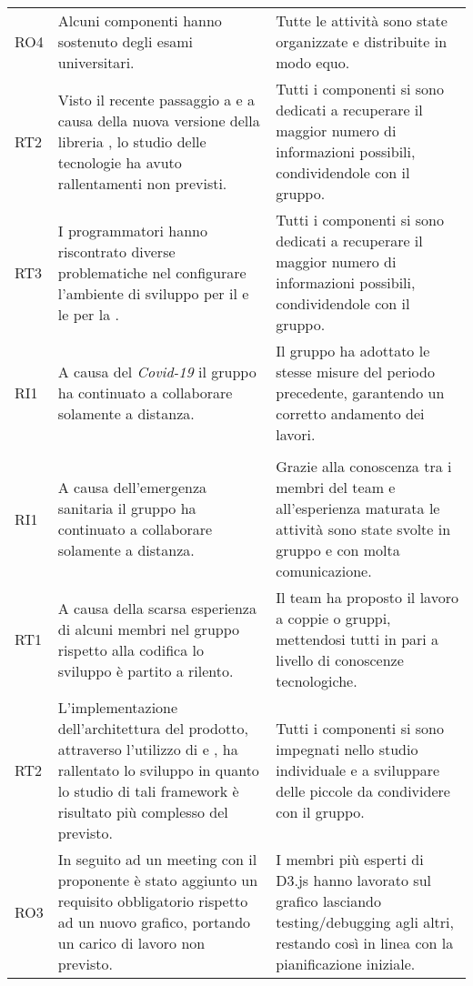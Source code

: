 \begin{longtable}{C{1cm} | C{8cm} | C{7cm}}
 	RO4 & Alcuni componenti hanno sostenuto degli esami universitari. &  Tutte le attività sono state organizzate e distribuite in modo equo.  \\	 	
 	
 	RT2 & Visto il recente passaggio a  e a causa della nuova versione della libreria , lo studio delle tecnologie ha avuto rallentamenti non previsti. &  Tutti i componenti si sono dedicati a recuperare il maggior numero di informazioni possibili, condividendole con il gruppo.  \\	 
 	
 	RT3 & I programmatori hanno riscontrato diverse problematiche nel configurare l'ambiente di sviluppo per il  e le  per la . &  Tutti i componenti si sono dedicati a recuperare il maggior numero di informazioni possibili, condividendole con il gruppo.  \\
 	 	
	RI1 & A causa del \textit{Covid-19} il gruppo ha continuato a collaborare solamente a distanza. & Il gruppo ha adottato le stesse misure del periodo precedente, garantendo un corretto andamento dei lavori. \\
	
 	 \\
 	
 	RI1 & A causa dell'emergenza sanitaria il gruppo ha continuato a collaborare solamente a distanza. & Grazie alla conoscenza tra i membri del team e all'esperienza maturata le attività sono state svolte in gruppo e con molta comunicazione. \\
 	RT1 & A causa della scarsa esperienza di alcuni membri nel gruppo rispetto alla codifica lo sviluppo è partito a rilento. & Il team ha proposto il lavoro a coppie o gruppi, mettendosi tutti in pari a livello di conoscenze tecnologiche.\\
 	RT2 & L'implementazione dell'architettura del prodotto, attraverso l'utilizzo di  e , ha rallentato lo sviluppo in quanto lo studio di tali framework è risultato più complesso del previsto. & Tutti i componenti si sono impegnati nello studio individuale e a sviluppare delle piccole  da condividere con il gruppo.\\
 	
 	RO3 & In seguito ad un meeting con il proponente è stato aggiunto un requisito obbligatorio rispetto ad un nuovo grafico, portando un carico di lavoro non previsto. & I membri più esperti di D3.js hanno lavorato sul grafico lasciando testing/debugging agli altri, restando così in linea con la pianificazione iniziale.\\
 	

\end{longtable}
